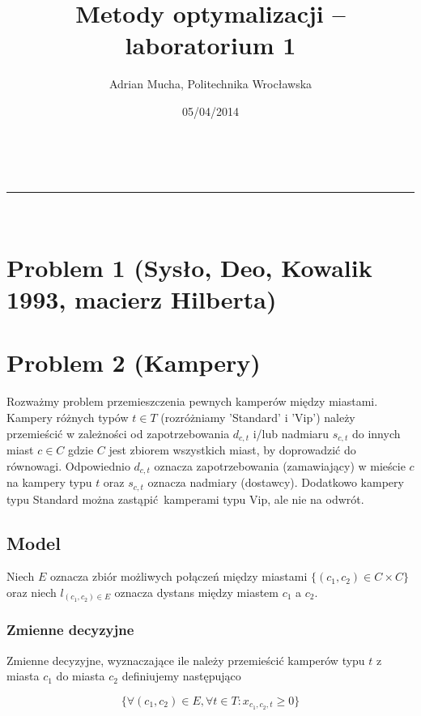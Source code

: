 \documentclass[a4paper,11pt]{article}
\makeatletter
\newcommand{\linia}{\rule{\linewidth}{0.5pt}}
\theoremstyle{mytheor}
\renewcommand{\maketitle}{
\begin{center}
\vspace{2ex}
{\huge \textsc{\@title}}
\vspace{1ex}
\\
\linia\\
\@author \hfill \@date
\vspace{4ex}
\end{center}
}
\makeatother
\begin{document}
\title{Metody optymalizacji – laboratorium 1}

\author{Adrian Mucha, Politechnika Wrocławska}

\date{05/04/2014}

\maketitle

\section*{Problem 1 (Sysło, Deo, Kowalik 1993, macierz Hilberta)}

\section*{Problem 2 (Kampery)}
Rozważmy problem przemieszczenia pewnych kamperów między miastami. Kampery różnych typów $t\in T$ (rozróżniamy 'Standard' i 'Vip') należy przemieścić w zależności od zapotrzebowania $d_{c,t}$ i/lub nadmiaru $s_{c,t}$ do innych miast $c\in C$ gdzie $C$ jest zbiorem wszystkich miast, by doprowadzić do równowagi. Odpowiednio $d_{c,t}$ oznacza zapotrzebowania (zamawiający) w mieście $c$ na kampery typu $t$ oraz $s_{c,t}$ oznacza nadmiary (dostawcy). Dodatkowo kampery typu Standard można zastąpić kamperami typu Vip, ale nie na odwrót.

\subsection*{Model}
Niech $E$ oznacza zbiór możliwych połączeń między miastami $\{(c_1, c_2) \in C\times C\}$ oraz niech $l_{(c_1, c_2)\in E}$ oznacza dystans między miastem $c_1$ a $c_2$.

\subsubsection*{Zmienne decyzyjne}
Zmienne decyzyjne, wyznaczające ile należy przemieścić kamperów typu $t$ z miasta $c_1$ do miasta $c_2$ definiujemy następująco

$$
    \{\forall (c_1, c_2)\in E, \forall t\in T: x_{c_1, c_2, t} \geq 0\}
$$
\end{document}
